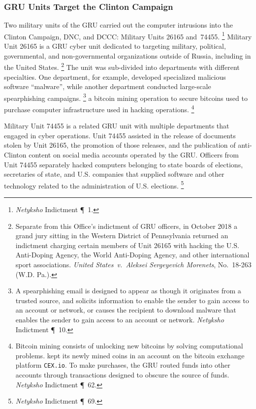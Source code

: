 \subsubsection{GRU Units Target the Clinton Campaign}

Two military units of the GRU carried out the computer intrusions into the Clinton Campaign, DNC, and DCCC: Military Units 26165 and~74455.%
\footnote{\textit{Netyksho} Indictment \P~1.}
Military Unit 26165 is a GRU cyber unit dedicated to targeting military, political, governmental, and non-governmental organizations outside of Russia, including in the United States.%
\footnote{Separate from this Office's indictment of GRU officers, in October 2018 a grand jury sitting in the Western District of Pennsylvania returned an indictment charging certain members of Unit 26165 with hacking the U.S. Anti-Doping Agency, the World Anti-Doping Agency, and other international sport associations.
\textit{United States~v.\ Aleksei Sergeyevich Morenets}, No.~18-263 (W.D. Pa.).}
The unit was sub-divided into departments with different specialties.
One department, for example, developed specialized malicious software ``malware'', while another department conducted large-scale spearphishing campaigns.%
\footnote{A spearphishing email is designed to appear as though it originates from a trusted source, and solicits information to enable the sender to gain access to an account or network, or causes the recipient to download malware that enables the sender to gain access to an account or network.
\textit{Netyksho} Indictment \P~10.}
 a bitcoin mining operation to secure bitcoins used to purchase computer infrastructure used in hacking operations.%
\footnote{Bitcoin mining consists of unlocking new bitcoins by solving computational problems.
 kept its newly mined coins in an account on the bitcoin exchange platform \verb+CEX.io+.
To make purchases, the GRU routed funds into other accounts through transactions designed to obscure the source
of funds.
\textit{Netyksho} Indictment \P~62.}

Military Unit 74455 is a related GRU unit with multiple departments that engaged in cyber operations.
Unit 74455 assisted in the release of documents stolen by Unit 26165, the promotion of those releases, and the publication of anti-Clinton content on social media accounts operated by the GRU\null.
Officers from Unit 74455 separately hacked computers belonging to state boards of elections, secretaries of state, and U.S. companies that supplied software and other technology related to the administration of U.S. elections.%
\footnote{\textit{Netyksho} Indictment \P~69.}

